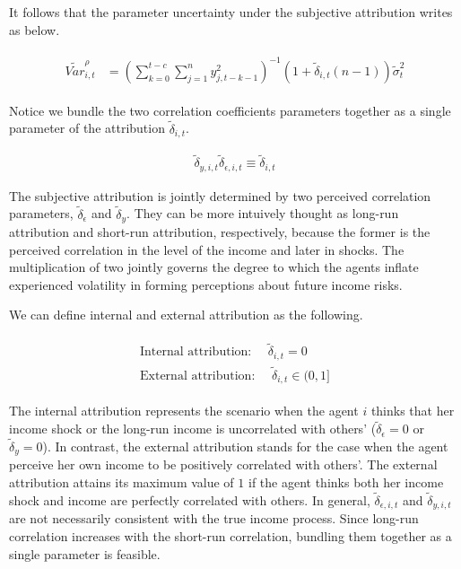 \documentclass[12pt,notitlepage,onecolumn,aps,pra]{article}
\begin{document}
It follows that the parameter uncertainty under the subjective
attribution writes as below.

\begin{eqnarray}
\begin{split}
\tilde {Var}^{\rho}_{i,t} & = (\sum^{t-c}_{k=0}\sum^{n}_{j=1}y^2_{j,t-k-1})^{-1}(1+ \tilde\delta_{i,t}(n-1))\tilde{\sigma}^2_{t}
\end{split}
\end{eqnarray}

Notice we bundle the two correlation coefficients parameters together as
a single parameter of the attribution \(\tilde\delta_{i,t}\).

\begin{eqnarray}
\tilde \delta_{y,i,t}\tilde \delta_{\epsilon,i,t}\equiv \tilde \delta_{i,t}  
\end{eqnarray}

The subjective attribution is jointly determined by two perceived
correlation parameters, \(\tilde \delta_{\epsilon}\) and
\(\tilde \delta_y\). They can be more intuively thought as long-run
attribution and short-run attribution, respectively, because the former
is the perceived correlation in the level of the income and later in
shocks. The multiplication of two jointly governs the degree to which
the agents inflate experienced volatility in forming perceptions about
future income risks.

We can define internal and external attribution as the following.

\begin{eqnarray}
\begin{split}
\textrm{Internal attribution: }\quad \tilde\delta_{i,t} = 0 \\
\textrm{External attribution: }\quad \tilde\delta_{i,t} \in (0,1]
\end{split}
\end{eqnarray}

The internal attribution represents the scenario when the agent \(i\)
thinks that her income shock or the long-run income is uncorrelated with
others' (\(\tilde \delta_{\epsilon} = 0\) or \(\tilde \delta_y = 0\)).
In contrast, the external attribution stands for the case when the agent
perceive her own income to be positively correlated with others'. The
external attribution attains its maximum value of \(1\) if the agent
thinks both her income shock and income are perfectly correlated with
others. In general, \(\tilde \delta_{\epsilon,i,t}\) and
\(\tilde \delta_{y,i,t}\) are not necessarily consistent with the true
income process. Since long-run correlation increases with the short-run
correlation, bundling them together as a single parameter is feasible.
\end{document}
